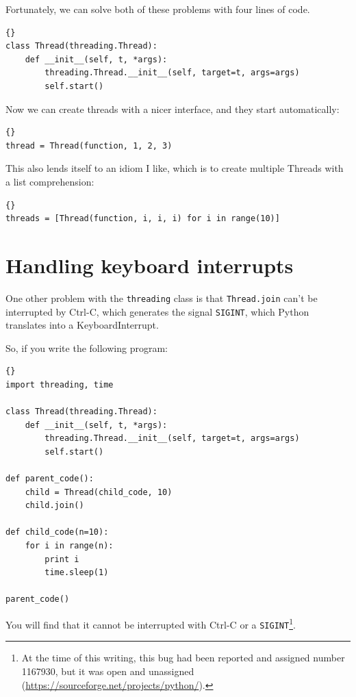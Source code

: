\documentclass{book}
\begin{document}
Fortunately, we can solve both of these problems with four
lines of code.

\begin{lstlisting}[caption={Cleaned-up Thread class}]{}
class Thread(threading.Thread):
    def __init__(self, t, *args):
        threading.Thread.__init__(self, target=t, args=args)
        self.start()
\end{lstlisting}

Now we can create threads with a nicer interface, and they
start automatically:

\begin{lstlisting}[caption={Thread example (my way)}]{}
thread = Thread(function, 1, 2, 3)
\end{lstlisting}

This also lends itself to an idiom I like, which is to create
multiple Threads with a list comprehension:

\begin{lstlisting}[caption={Multiple thread example}]{}
threads = [Thread(function, i, i, i) for i in range(10)]
\end{lstlisting}

\section{Handling keyboard interrupts}

One other problem with the {\tt threading} class is that 
{\tt Thread.join} can't be interrupted by Ctrl-C, which
generates the signal {\tt SIGINT}, which Python translates
into a KeyboardInterrupt.

\newpage
So, if you write the following program:

\begin{lstlisting}[caption={Unstoppable program}]{}
import threading, time

class Thread(threading.Thread):
    def __init__(self, t, *args):
        threading.Thread.__init__(self, target=t, args=args)
        self.start()

def parent_code():
    child = Thread(child_code, 10)
    child.join()

def child_code(n=10):
    for i in range(n):
        print i
        time.sleep(1)
    
parent_code()
\end{lstlisting}

You will find that it cannot be interrupted with Ctrl-C or
a {\tt SIGINT}\footnote{At the time of this writing, this
bug had been reported and assigned number 1167930, but it was
open and unassigned (\url{https://sourceforge.net/projects/python/}).}.
\end{document}
